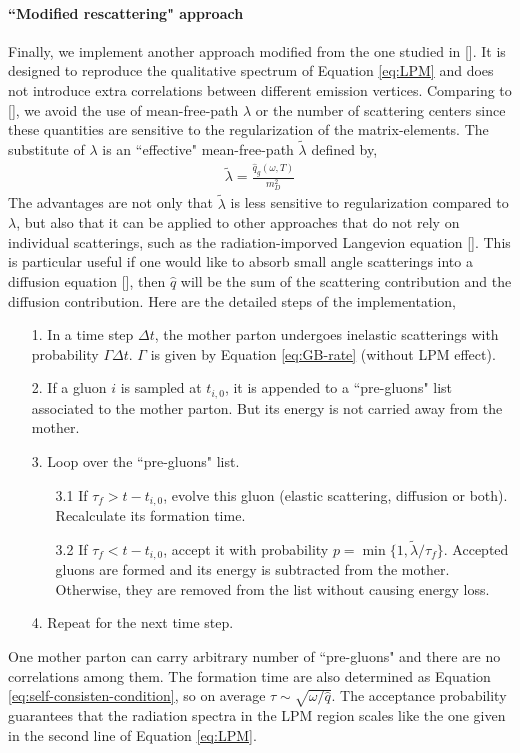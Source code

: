 \documentclass[aps, prc, reprint, amsmath, groupedaddress, nofootinbib]{revtex4-1}
\begin{document}
\paragraph*{``Modified rescattering" approach} Finally, we implement another approach modified from the one studied in [].
It is designed to reproduce the qualitative spectrum of Equation \ref{eq:LPM} and does not introduce extra correlations between different emission vertices. 
Comparing to [], we avoid the use of mean-free-path $\lambda$ or the number of scattering centers since these quantities are sensitive to the regularization of the matrix-elements. 
The substitute of $\lambda$ is an ``effective" mean-free-path $\tilde{\lambda}$ defined by,
\begin{eqnarray}\label{eq:effmpf}
\tilde{\lambda} = \frac{\hat{q}_g(\omega, T)}{m_D^2}
\end{eqnarray}
The advantages are not only that $\tilde{\lambda}$ is less sensitive to regularization compared to $\lambda$, but also that it can be applied to other approaches that do not rely on individual scatterings, such as the radiation-imporved Langevion equation [].
This is particular useful if one would like to absorb small angle scatterings into a diffusion equation [], then $\hat{q}$ will be the sum of the scattering contribution and the diffusion contribution.
Here are the detailed steps of the implementation,
\begin{itemize}
\item[1.] In a time step $\Delta t$, the mother parton undergoes inelastic scatterings with probability $\Gamma\Delta t$. $\Gamma$ is given by Equation \ref{eq:GB-rate} (without LPM effect).
\item[2.] If a gluon $i$ is sampled at $t_{i,0}$, it is appended to a ``pre-gluons" list associated to the mother parton. But its energy is not carried away from the mother.
\item[3.] Loop over the ``pre-gluons" list. 
\begin{itemize}
\item[3.1] If $\tau_f > t-t_{i,0}$, evolve this gluon (elastic scattering, diffusion or both). Recalculate its formation time.
\item[3.2] If $\tau_f < t-t_{i,0}$, accept it with probability $p = \min\{1, \tilde{\lambda}/\tau_f\}$. Accepted gluons are formed and its energy is subtracted from the mother. Otherwise, they are removed from the list without causing energy loss.
\end{itemize} 
\item[4.] Repeat for the next time step.
\end{itemize}
One mother parton can carry arbitrary number of ``pre-gluons" and there are no correlations among them.
The formation time are also determined as Equation \ref{eq:self-consisten-condition}, so on average $\tau \sim \sqrt{\omega/\hat{q}}$.
The acceptance probability guarantees that the radiation spectra in the LPM region scales like the one given in the second line of Equation \ref{eq:LPM}.
\end{document}
